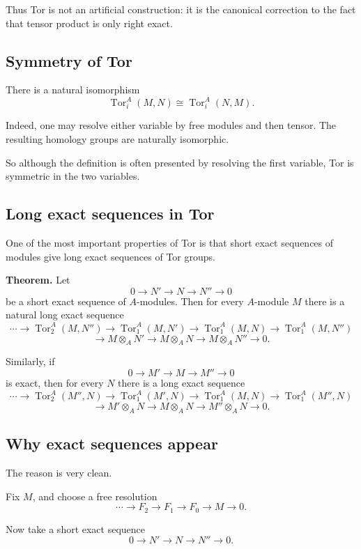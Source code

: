 \documentclass[12pt,a4paper]{article}
\theoremstyle{notespace}
\begin{document}
Thus Tor is not an artificial construction: it is the canonical correction to the fact that tensor product is only right exact.

\subsection{Symmetry of Tor}

There is a natural isomorphism
\[
\operatorname{Tor}_i^A(M,N)\cong \operatorname{Tor}_i^A(N,M).
\]

Indeed, one may resolve either variable by free modules and then tensor. The resulting homology groups are naturally isomorphic.

So although the definition is often presented by resolving the first variable, Tor is symmetric in the two variables.

\subsection{Long exact sequences in Tor}

One of the most important properties of Tor is that short exact sequences of modules give long exact sequences of Tor groups.

\medskip

\textbf{Theorem.}
Let
\[
0\to N' \to N \to N'' \to 0
\]
be a short exact sequence of \(A\)-modules. Then for every \(A\)-module \(M\) there is a natural long exact sequence
\[
\cdots
\to
\operatorname{Tor}_2^A(M,N'')
\to
\operatorname{Tor}_1^A(M,N')
\to
\operatorname{Tor}_1^A(M,N)
\to
\operatorname{Tor}_1^A(M,N'')
\]
\[
\to
M\otimes_A N'
\to
M\otimes_A N
\to
M\otimes_A N''
\to
0.
\]

Similarly, if
\[
0\to M' \to M \to M'' \to 0
\]
is exact, then for every \(N\) there is a long exact sequence
\[
\cdots
\to
\operatorname{Tor}_2^A(M'',N)
\to
\operatorname{Tor}_1^A(M',N)
\to
\operatorname{Tor}_1^A(M,N)
\to
\operatorname{Tor}_1^A(M'',N)
\]
\[
\to
M'\otimes_A N
\to
M\otimes_A N
\to
M''\otimes_A N
\to
0.
\]

\subsection{Why exact sequences appear}

The reason is very clean.

Fix \(M\), and choose a free resolution
\[
\cdots \to F_2\to F_1\to F_0\to M\to 0.
\]

Now take a short exact sequence
\[
0\to N' \to N \to N'' \to 0.
\]
\end{document}
